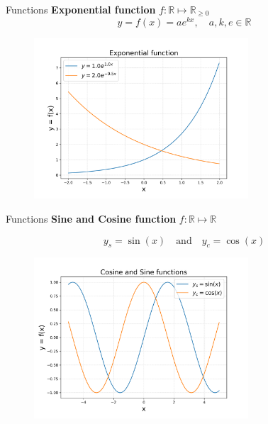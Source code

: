 \documentclass[aspectratio=169]{beamer}
\begin{document}
\begin{frame}[t]{Functions}
    \textbf{Exponential function} $f: \mathbb{R} \mapsto \mathbb{R}_{\geq 0}$
    $$ y = f(x) = a e^{k x}, \quad a, k, e \in \mathbb{R} $$
    
    \begin{figure}[h]
        \centering
        \includegraphics[width=8cm]{../../analysis/output/mathprelim/expfunc.png}
    \end{figure}
\end{frame}

\begin{frame}[t]{Functions}
    \textbf{Sine and Cosine function} $f: \mathbb{R} \mapsto \mathbb{R}$

    $$y_s = \sin(x) \quad \text{and} \quad y_c = \cos(x) $$
    
    \begin{figure}[h]
        \centering
        \includegraphics[width=8cm]{../../analysis/output/mathprelim/cosinfunc.png}
    \end{figure}
\end{frame}
\end{document}
